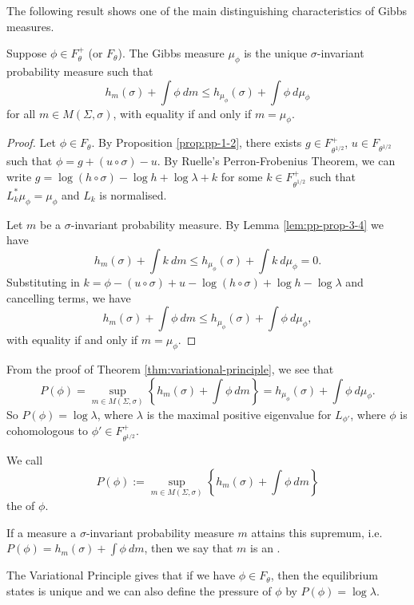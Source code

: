 The following result shows one of the main distinguishing characteristics of Gibbs measures.

\begin{theorem} \label{thm:variational-principle}
	Suppose $\phi \in F_\theta^+$ (or $F_\theta$). The Gibbs measure $\mu_\phi$ is the unique $\sigma$-invariant probability measure such that
	\[
		h_m(\sigma) + \int{\phi\ dm} \leq h_{\mu_\phi}(\sigma) + \int{\phi\ d\mu_\phi}
	\]
	for all $m \in M(\Sigma, \sigma)$, with equality if and only if $m = \mu_\phi$.
	\begin{proof}
		Let $\phi \in F_\theta$. By Proposition \ref{prop:pp-1-2}, there exists $g \in F_{\theta^{1 / 2}}^+$, $u \in F_{\theta^{1 / 2}}$ such that $\phi = g + (u \circ \sigma) - u$. By Ruelle's Perron-Frobenius Theorem, we can write $g = \log(h \circ \sigma) - \log{h} + \log{\lambda} + k$ for some $k \in F_{\theta^{1/2}}^+$ such that $L_k^*{\mu_\phi} = \mu_\phi$ and $L_k$ is normalised.
		
		Let $m$ be a $\sigma$-invariant probability measure. By Lemma \ref{lem:pp-prop-3-4} we have
		\[
			h_m(\sigma) + \int{k\ dm} \leq h_{\mu_\phi}(\sigma) + \int{k\ d\mu_\phi} = 0.
		\]
		Substituting in $k = \phi - (u \circ \sigma) + u - \log(h \circ \sigma) + \log{h} - \log{\lambda}$ and cancelling terms, we have
		\[
			h_m(\sigma) + \int{\phi\ dm} \leq h_{\mu_\phi}(\sigma) + \int{\phi\ d\mu_\phi},
		\]
		with equality if and only if $m = \mu_\phi$.
	\end{proof}
\end{theorem}

From the proof of Theorem \ref{thm:variational-principle}, we see that
\[
	P(\phi) = \sup_{m \in M(\Sigma, \sigma)}\left\{h_m(\sigma) + \int{\phi\ dm}\right\} = h_{\mu_\phi}(\sigma) + \int{\phi\ d\mu_\phi}.
\]
So $P(\phi) = \log{\lambda}$, where $\lambda$ is the maximal positive eigenvalue for $L_{\phi'}$, where $\phi$ is cohomologous to $\phi' \in F_{\theta^{1 / 2}}^+$.

\begin{definition}
	We call
	\[
		P(\phi) := \sup_{m \in M(\Sigma, \sigma)}\left\{h_m(\sigma) + \int{\phi\ dm}\right\}
	\]
	the  of $\phi$.
	
	If a measure a $\sigma$-invariant probability measure $m$ attains this supremum, i.e. $P(\phi) = h_m(\sigma) + \int{\phi\ dm}$, then we say that $m$ is an .
\end{definition}

The Variational Principle gives that if we have $\phi \in F_\theta$, then the equilibrium states is unique and we can also define the pressure of $\phi$ by $P(\phi) = \log{\lambda}$.

